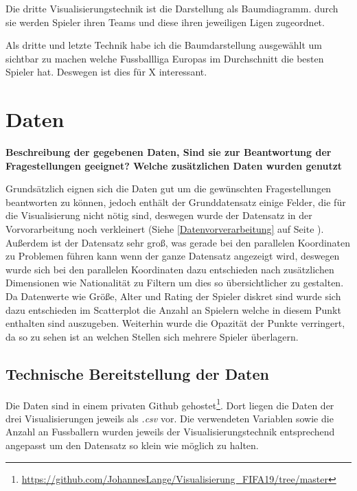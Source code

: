 \documentclass[usegeometry=true]{scrartcl}
\begin{document}
Die dritte Visualisierungstechnik ist die Darstellung als Baumdiagramm. durch sie werden Spieler ihren Teams und diese ihren jeweiligen Ligen zugeordnet.



Als dritte und letzte Technik habe ich die Baumdarstellung ausgewählt um sichtbar zu machen welche Fussballliga Europas im Durchschnitt die besten Spieler hat. Deswegen ist dies für X interessant.\\

\section{Daten}

\textbf{Beschreibung der gegebenen Daten, Sind sie zur Beantwortung der Fragestellungen geeignet? Welche zusätzlichen Daten wurden genutzt} 

Grundsätzlich eignen sich die Daten gut um die gewünschten Fragestellungen beantworten zu können, jedoch enthält der Grunddatensatz einige Felder, die für die Visualisierung nicht nötig sind, deswegen wurde der Datensatz in der Vorvorarbeitung noch verkleinert (Siehe \ref{Datenvorverarbeitung} auf Seite \pageref{Datenvorverarbeitung}). Außerdem ist der Datensatz sehr groß, was gerade bei den parallelen Koordinaten zu Problemen führen kann wenn der ganze Datensatz angezeigt wird, deswegen wurde sich bei den parallelen Koordinaten dazu entschieden nach zusätzlichen Dimensionen wie Nationalität zu Filtern um dies so übersichtlicher zu gestalten. Da Datenwerte wie Größe, Alter und Rating der Spieler diskret sind wurde sich dazu entschieden im Scatterplot die Anzahl an Spielern welche in diesem Punkt enthalten sind auszugeben. Weiterhin wurde die Opazität der Punkte verringert, da so zu sehen ist an welchen Stellen sich mehrere Spieler überlagern. 
\subsection{Technische Bereitstellung der Daten}
Die Daten sind in einem privaten Github gehostet\footnote{\url{https://github.com/JohannesLange/Visualisierung_FIFA19/tree/master}}. Dort liegen die Daten der drei Visualisierungen jeweils als \textit{.csv} vor. Die verwendeten Variablen sowie die Anzahl an Fussballern wurden jeweils der Visualisierungstechnik entsprechend angepasst um den Datensatz so klein wie möglich zu halten.
\end{document}
